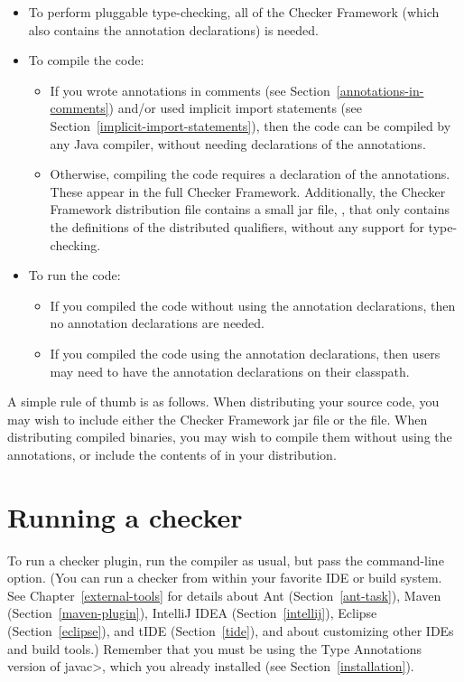 \begin{itemize}
\item
To perform pluggable type-checking, all of the Checker Framework (which
also contains the annotation declarations) is needed.
\item
To compile the code:
\begin{itemize}
\item
  If you wrote annotations in comments (see
  Section~\ref{annotations-in-comments}) and/or used implicit import
  statements (see Section~\ref{implicit-import-statements}), then the code
  can be compiled by any Java compiler, without needing declarations of the
  annotations.
\item
  Otherwise, compiling the code requires a declaration of the annotations.
  These appear in the full Checker Framework.  Additionally, the Checker
  Framework distribution  file contains a small jar file,
  , that only contains the definitions of the
  distributed qualifiers, without any support for type-checking.
\end{itemize}
\item
To run the code:
\begin{itemize}
\item
  If you compiled the code without using the annotation declarations, then
  no annotation declarations are needed.
\item
  If you compiled the code using the annotation declarations, then users
  may need to have the annotation declarations on their classpath.
\end{itemize}
\end{itemize}

A simple rule of thumb is as follows.  When distributing your source code,
you may wish to include either the Checker Framework jar file or the
 file.  When distributing compiled binaries, you
may wish to compile them without using the annotations, or include the
contents of  in your distribution.


\section{Running a checker\label{running}}

To run a checker plugin, run the compiler  as usual,
but pass the  command-line
option.
(You can run a checker from within your favorite IDE or build system.  See
Chapter~\ref{external-tools} for details about
Ant (Section~\ref{ant-task}),
Maven (Section~\ref{maven-plugin}),
IntelliJ IDEA (Section~\ref{intellij}),
Eclipse (Section~\ref{eclipse}),
and
tIDE (Section~\ref{tide}), and about customizing other IDEs and build tools.)
Remember that you must be using the
Type Annotations version of \<javac>, which you already installed (see Section~\ref{installation}).

